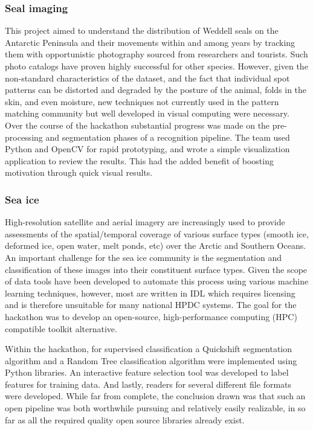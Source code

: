 \documentclass[conference]{IEEEtran}
\begin{document}
\subsubsection{Seal imaging} This project aimed to understand the distribution of Weddell seals on the Antarctic Peninsula and their movements within and among years by tracking them with opportunistic photography sourced from researchers and tourists. Such photo catalogs have proven highly successful for other species.  However, given the non-standard characteristics of the dataset, and the fact that individual spot patterns can be distorted and degraded by the posture of the animal, folds in the skin, and even moisture, new techniques not currently used in the pattern matching community but well developed in visual computing were necessary.  Over the course of the hackathon substantial progress was made on the pre-processing and segmentation phases of a recognition pipeline.  The team used Python and OpenCV for rapid prototyping, and wrote a simple visualization application to review the results.  This had the added benefit of boosting motivation through quick visual results.
\subsubsection{Sea ice}
High-resolution satellite and aerial imagery are increasingly used to provide assessments of the spatial/temporal coverage of various surface types (smooth ice, deformed ice, open water, melt ponds, etc) over the Arctic and Southern Oceans. An important challenge for the sea ice community is the segmentation and classification of these images into their constituent surface types. Given the scope of data tools have been developed to automate this process using various machine learning techniques, however, most are written in IDL which requires licensing and is therefore unsuitable for many national HPDC systems. The goal for the hackathon was to develop an open-source, high-performance computing (HPC) compatible toolkit alternative.

Within the hackathon, for supervised classification a Quickshift segmentation algorithm and a Random Tree classification algorithm were implemented using Python libraries. An interactive feature selection tool was developed to label features for training data. And lastly, readers for several different file formats were developed.  While far from complete, the conclusion drawn was that such an open pipeline was both worthwhile pursuing and relatively easily realizable, in so far as all the required quality open source libraries already exist.
\end{document}
